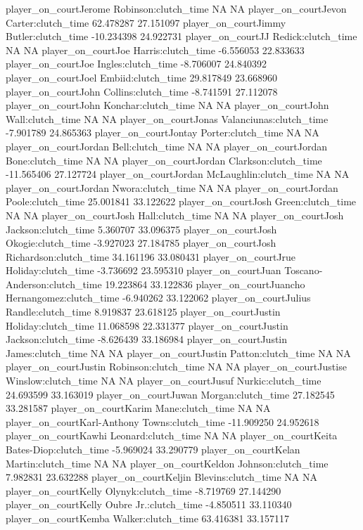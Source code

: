 \documentclass[
  landscape]{article}
\begin{document}
player\_on\_courtJerome Robinson:clutch\_time NA NA
player\_on\_courtJevon Carter:clutch\_time 62.478287 27.151097
player\_on\_courtJimmy Butler:clutch\_time -10.234398 24.922731
player\_on\_courtJJ Redick:clutch\_time NA NA player\_on\_courtJoe
Harris:clutch\_time -6.556053 22.833633 player\_on\_courtJoe
Ingles:clutch\_time -8.706007 24.840392 player\_on\_courtJoel
Embiid:clutch\_time 29.817849 23.668960 player\_on\_courtJohn
Collins:clutch\_time -8.741591 27.112078 player\_on\_courtJohn
Konchar:clutch\_time NA NA player\_on\_courtJohn Wall:clutch\_time NA NA
player\_on\_courtJonas Valanciunas:clutch\_time -7.901789 24.865363
player\_on\_courtJontay Porter:clutch\_time NA NA
player\_on\_courtJordan Bell:clutch\_time NA NA player\_on\_courtJordan
Bone:clutch\_time NA NA player\_on\_courtJordan Clarkson:clutch\_time
-11.565406 27.127724 player\_on\_courtJordan McLaughlin:clutch\_time NA
NA player\_on\_courtJordan Nwora:clutch\_time NA NA
player\_on\_courtJordan Poole:clutch\_time 25.001841 33.122622
player\_on\_courtJosh Green:clutch\_time NA NA player\_on\_courtJosh
Hall:clutch\_time NA NA player\_on\_courtJosh Jackson:clutch\_time
5.360707 33.096375 player\_on\_courtJosh Okogie:clutch\_time -3.927023
27.184785 player\_on\_courtJosh Richardson:clutch\_time 34.161196
33.080431 player\_on\_courtJrue Holiday:clutch\_time -3.736692 23.595310
player\_on\_courtJuan Toscano-Anderson:clutch\_time 19.223864 33.122836
player\_on\_courtJuancho Hernangomez:clutch\_time -6.940262 33.122062
player\_on\_courtJulius Randle:clutch\_time 8.919837 23.618125
player\_on\_courtJustin Holiday:clutch\_time 11.068598 22.331377
player\_on\_courtJustin Jackson:clutch\_time -8.626439 33.186984
player\_on\_courtJustin James:clutch\_time NA NA player\_on\_courtJustin
Patton:clutch\_time NA NA player\_on\_courtJustin Robinson:clutch\_time
NA NA player\_on\_courtJustise Winslow:clutch\_time NA NA
player\_on\_courtJusuf Nurkic:clutch\_time 24.693599 33.163019
player\_on\_courtJuwan Morgan:clutch\_time 27.182545 33.281587
player\_on\_courtKarim Mane:clutch\_time NA NA
player\_on\_courtKarl-Anthony Towns:clutch\_time -11.909250 24.952618
player\_on\_courtKawhi Leonard:clutch\_time NA NA player\_on\_courtKeita
Bates-Diop:clutch\_time -5.969024 33.290779 player\_on\_courtKelan
Martin:clutch\_time NA NA player\_on\_courtKeldon Johnson:clutch\_time
7.982831 23.632288 player\_on\_courtKeljin Blevins:clutch\_time NA NA
player\_on\_courtKelly Olynyk:clutch\_time -8.719769 27.144290
player\_on\_courtKelly Oubre Jr.:clutch\_time -4.850511 33.110340
player\_on\_courtKemba Walker:clutch\_time 63.416381 33.157117
\end{document}
